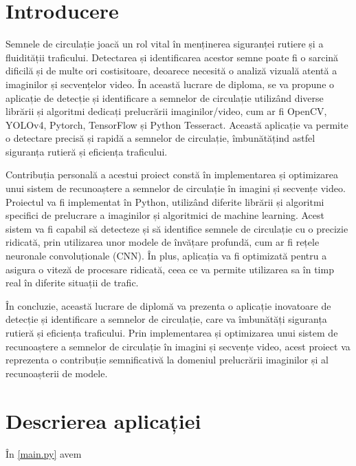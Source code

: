 \documentclass[12pt, a4paper, twoside, romanian]{teza-etti}
\begin{document}
\beforepreface{}
\listoffigures
\listoftables
{}
\afterpreface{}

\chapter{Introducere}
Semnele de circulație joacă un rol vital în menținerea siguranței rutiere și a fluidității traficului.
Detectarea și identificarea acestor semne poate fi o sarcină dificilă și de multe ori costisitoare,
deoarece necesită o analiză vizuală atentă a imaginilor și secvențelor video.
În această lucrare de diploma, se va propune o aplicație de detecție și identificare a semnelor de circulație utilizând diverse librării și algoritmi dedicați prelucrării imaginilor/video, cum ar fi OpenCV, YOLOv4, Pytorch, TensorFlow și Python Tesseract. Această aplicație va permite o detectare precisă și rapidă a semnelor de circulație, îmbunătățind astfel siguranța rutieră și eficiența traficului.

Contribuția personală a acestui proiect constă în implementarea și optimizarea unui sistem de recunoaștere a semnelor de circulație în imagini și secvențe video. Proiectul va fi implementat în Python, utilizând diferite librării și algoritmi specifici de prelucrare a imaginilor și algoritmici de machine learning. Acest sistem va fi capabil să detecteze și să identifice semnele de circulație cu o precizie ridicată, prin utilizarea unor modele de învățare profundă, cum ar fi rețele neuronale convoluționale (CNN). În plus, aplicația va fi optimizată pentru a asigura o viteză de procesare ridicată, ceea ce va permite utilizarea sa în timp real în diferite situații de trafic.

În concluzie, această lucrare de diplomă va prezenta o aplicație inovatoare de detecție și identificare a semnelor de circulație, care va îmbunătăți siguranța rutieră și eficiența traficului. Prin implementarea și optimizarea unui sistem de recunoaștere a semnelor de circulație în imagini și secvențe video, acest proiect va reprezenta o contribuție semnificativă la domeniul prelucrării imaginilor și al recunoașterii de modele.

\chapter{Descrierea aplicației}
În {\ref{main.py}} avem
% 
% 
\appendix
\end{document}
